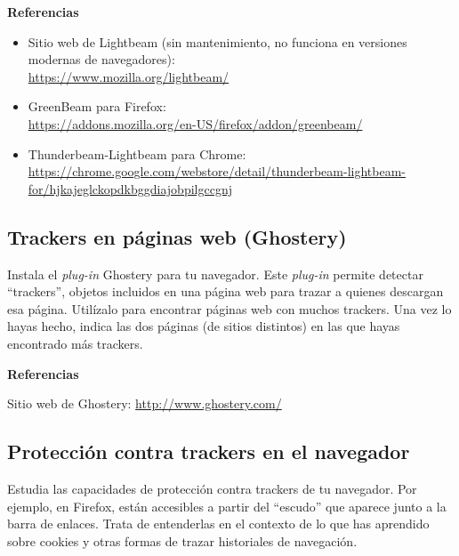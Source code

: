 \textbf{Referencias}

\begin{itemize}
\item Sitio web de Lightbeam (sin mantenimiento, no funciona en versiones modernas de navegadores): \\
  \url{https://www.mozilla.org/lightbeam/}
\item GreenBeam para Firefox: \\
  \url{https://addons.mozilla.org/en-US/firefox/addon/greenbeam/}
\item Thunderbeam-Lightbeam para Chrome: \\
  \url{https://chrome.google.com/webstore/detail/thunderbeam-lightbeam-for/hjkajeglckopdkbggdiajobpilgccgnj}
\end{itemize}

\subsection{Trackers en páginas web (Ghostery)}
\label{subsec:trackers-paginas-web-2}

Instala el \emph{plug-in} Ghostery para tu navegador. Este \emph{plug-in} permite detectar ``trackers'', objetos incluidos en una página web para trazar a quienes descargan esa página. Utilízalo para encontrar páginas web con muchos trackers. Una vez lo hayas hecho, indica las dos páginas (de sitios distintos) en las que hayas encontrado más trackers.

\textbf{Referencias}

Sitio web de Ghostery: \url{http://www.ghostery.com/}

\subsection{Protección contra trackers en el navegador}
\label{subsec:trackers-navegador}

Estudia las capacidades de protección contra trackers de tu navegador. Por ejemplo, en Firefox, están accesibles a partir del ``escudo'' que aparece junto a la barra de enlaces. Trata de entenderlas en el contexto de lo que has aprendido sobre cookies y otras formas de trazar historiales de navegación.

